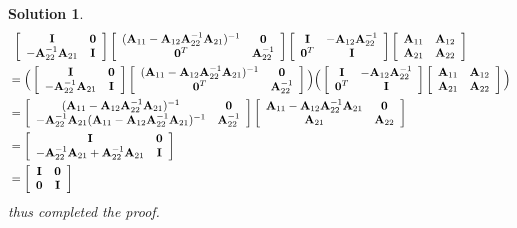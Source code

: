 \documentclass[11pt]{article}
\newtheorem{sol}{Solution}
\begin{document}
\begin{sol}
\begin{align*}
		&\ \left[\begin{array}{cc} {\bf I}& {\bf 0}\\ -{\bf A}_{22}^{-1}{\bf A}_{21} &{\bf I}  \end{array}\right]\left[\begin{array}{cc} ({\bf A}_{11}- {\bf A}_{12}{\bf A}_{22}^{-1}{\bf A}_{21})^{-1}& {\bf 0}\\ {\bf 0}^T& {\bf A}_{22}^{-1}\end{array}\right]\left[\begin{array}{cc} {\bf I}& -{\bf A}_{12}{\bf A}_{22}^{-1}\\ {\bf 0}^T& {\bf I}\end{array}\right]\left[\begin{array}{cc}{\bf A}_{11}& {\bf A}_{12}\\ {\bf A}_{21}& {\bf A}_{22}\end{array}\right]\\
		&= \Big(\left[\begin{array}{cc} {\bf I}& {\bf 0}\\ -{\bf A}_{22}^{-1}{\bf A}_{21} &{\bf I}  \end{array}\right]\left[\begin{array}{cc} ({\bf A}_{11}- {\bf A}_{12}{\bf A}_{22}^{-1}{\bf A}_{21})^{-1}& {\bf 0}\\ {\bf 0}^T& {\bf A}_{22}^{-1}\end{array}\right]\Big)\Big(\left[\begin{array}{cc} {\bf I}& -{\bf A}_{12}{\bf A}_{22}^{-1}\\ {\bf 0}^T& {\bf I}\end{array}\right]\left[\begin{array}{cc}{\bf A}_{11}& {\bf A}_{12}\\ {\bf A}_{21}& {\bf A}_{22}\end{array}\right]\Big)\\
		&= \left[\begin{array}{cc} ({\bf A}_{11} - {\bf A}_{12}{\bf A}_{22}^{-1}{\bf A}_{21})^{-1}& {\bf 0}\\ -{\bf A}_{22}^{-1}{\bf A}_{21}({\bf A}_{11} - {\bf A}_{12}{\bf A}_{22}^{-1}{\bf A}_{21})^{-1}& {\bf A}_{22}^{-1}\end{array}\right] \left[\begin{array}{cc} {\bf A}_{11} - {\bf A}_{12}{\bf A}_{22}^{-1}{\bf A}_{21}&{\bf 0} \\ {\bf A}_{21}& {\bf A}_{22}\end{array}\right]\\
		&= \left[\begin{array}{cc} {\bf I}& {\bf 0}\\ -{\bf A}_{22}^{-1}{\bf A}_{21} + {\bf A}_{22}^{-1}{\bf A}_{21}& {\bf I}\end{array}\right]\\
		&= \left[\begin{array}{cc} {\bf I}& {\bf 0}\\ {\bf 0}& {\bf I}\end{array}\right]
	\end{align*}
	thus completed the proof.
\end{sol}
\end{document}
